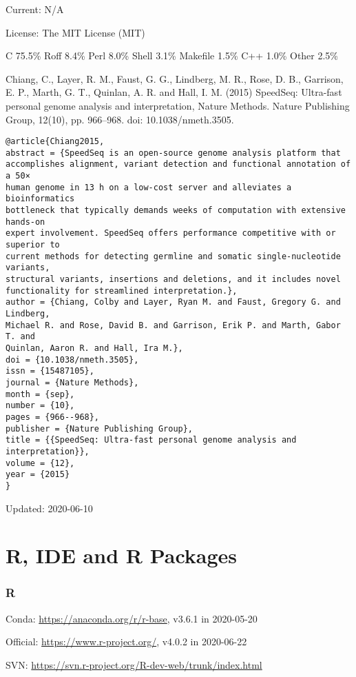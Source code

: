 \documentclass[]{article}
\begin{document}
Current: N/A

License: The MIT License (MIT)

C 75.5\% Roff 8.4\% Perl 8.0\% Shell 3.1\% Makefile 1.5\% C++ 1.0\% Other 2.5\%

Chiang, C., Layer, R. M., Faust, G. G., Lindberg, M. R., Rose, D. B., Garrison, E. P., Marth, G. T., Quinlan, A. R. and Hall, I. M. (2015) SpeedSeq: Ultra-fast personal genome analysis and interpretation, Nature Methods. Nature Publishing Group, 12(10), pp. 966–968. doi: 10.1038/nmeth.3505.

\begin{verbatim}
@article{Chiang2015,
abstract = {SpeedSeq is an open-source genome analysis platform that
accomplishes alignment, variant detection and functional annotation of a 50×
human genome in 13 h on a low-cost server and alleviates a bioinformatics
bottleneck that typically demands weeks of computation with extensive hands-on
expert involvement. SpeedSeq offers performance competitive with or superior to
current methods for detecting germline and somatic single-nucleotide variants,
structural variants, insertions and deletions, and it includes novel
functionality for streamlined interpretation.},
author = {Chiang, Colby and Layer, Ryan M. and Faust, Gregory G. and Lindberg,
Michael R. and Rose, David B. and Garrison, Erik P. and Marth, Gabor T. and
Quinlan, Aaron R. and Hall, Ira M.},
doi = {10.1038/nmeth.3505},
issn = {15487105},
journal = {Nature Methods},
month = {sep},
number = {10},
pages = {966--968},
publisher = {Nature Publishing Group},
title = {{SpeedSeq: Ultra-fast personal genome analysis and interpretation}},
volume = {12},
year = {2015}
}
\end{verbatim}

Updated: 2020-06-10

\part{R, IDE and R Packages}

\section{R}

Conda: \url{https://anaconda.org/r/r-base}, v3.6.1 in 2020-05-20

Official: \url{https://www.r-project.org/}, v4.0.2 in 2020-06-22

SVN: \url{https://svn.r-project.org/R-dev-web/trunk/index.html}
\end{document}
